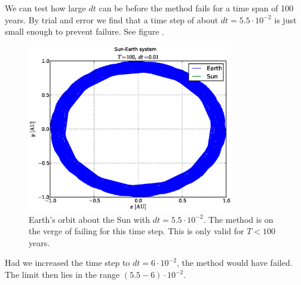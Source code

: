 We can test how large $dt$ can be before the method fails for a time span of 100
years. By trial and error we
find that a time step of about $dt = 5.5 \cdot 10^{-2}$ is just small enough to
prevent failure. See figure .
%
\begin{figure}[htpb]
	\centering
	\includegraphics[width=0.8\textwidth]{figures/sun_earth_T100_dt5-5e-2}
	\caption{Earth's orbit about the Sun with $dt = 5.5 \cdot 10^{-2}$. The
	method is on the verge of failing for this time step. This is only valid for
	$T < 100$ years.}
	\label{fig:sunEarth-dt5.5e-2}
\end{figure}
%
Had we increased the time step to $dt = 6 \cdot 10^{-2}$, the method would have
failed. The limit then lies in the range $(5.5 - 6) \cdot 10^{-2}$.
